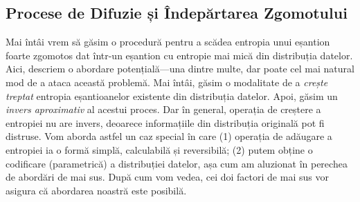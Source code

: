 \documentclass[../../book-main_ro.tex]{subfiles}
\begin{document}
\subsection{Procese de Difuzie și Îndepărtarea Zgomotului} \label{sub:intro_diffusion_denoising}

Mai întâi vrem să găsim o procedură pentru a scădea entropia unui eșantion foarte zgomotos dat într-un eșantion cu entropie mai mică din distribuția datelor. Aici, descriem o abordare potențială—una dintre multe, dar poate cel mai natural mod de a ataca această problemă. Mai întâi, găsim o modalitate de a \textit{crește treptat} entropia eșantioanelor existente din distribuția datelor. Apoi, găsim un \textit{invers aproximativ} al acestui proces. Dar în general, operația de creștere a entropiei nu are invers, deoarece informațiile din distribuția originală pot fi distruse. Vom aborda astfel un caz special în care (1) operația de adăugare a entropiei ia o formă simplă, calculabilă și reversibilă; (2) putem obține o codificare (parametrică) a distribuției datelor, așa cum am aluzionat în perechea de abordări de mai sus. După cum vom vedea, cei doi factori de mai sus vor asigura că abordarea noastră este posibilă.
\end{document}
